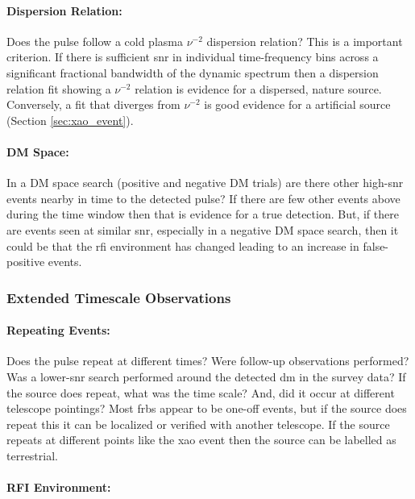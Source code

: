 \documentclass[a4paper,fleqn,usenatbib]{mnras}
\begin{document}
\paragraph{Dispersion Relation:}

Does the pulse follow a cold plasma $\nu^{-2}$ dispersion relation? This is a
important criterion. If there is sufficient \gls{snr} in individual
time-frequency bins across a significant fractional bandwidth of the dynamic
spectrum then a dispersion relation fit showing a $\nu^{-2}$ relation is
evidence for a dispersed, nature source. Conversely, a fit that diverges from
$\nu^{-2}$ is good evidence for a artificial source (Section
\ref{sec:xao_event}).

\paragraph{DM Space:}

In a DM space search (positive and negative DM trials) are there other
high-\gls{snr} events nearby in time to the detected pulse? If there are few
other events above during the time window then that is evidence for a true
detection. But, if there are events seen at similar \gls{snr}, especially in a
negative DM space search, then it could be that the \gls{rfi} environment has
changed leading to an increase in false-positive events.

\subsubsection{Extended Timescale Observations}

\paragraph{Repeating Events:}

Does the pulse repeat at different times? Were follow-up observations performed?
Was a lower-\gls{snr} search performed around the detected \gls{dm} in the
survey data? If the source does repeat, what was the time scale? And, did it
occur at different telescope pointings? Most \glspl{frb} appear to be one-off
events, but if the source does repeat this it can be localized or verified with
another telescope. If the source repeats at different points like the \gls{xao}
event then the source can be labelled as terrestrial.

\paragraph{RFI Environment:}
\end{document}
